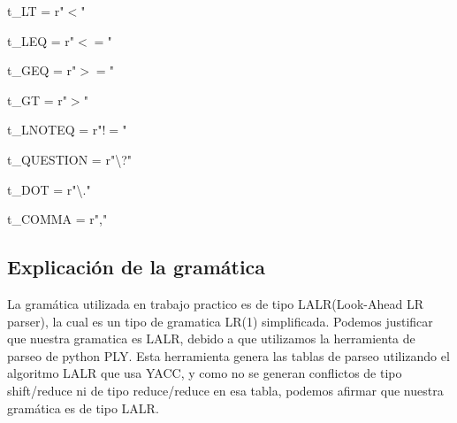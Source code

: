 t\_LT = r"$<$"
                                            
t\_LEQ = r"$<=$"
                                               
t\_GEQ = r"$>=$"
                                                 
t\_GT = r"$>$"
                                                   
t\_LNOTEQ = r"$!=$"
                                                     
t\_QUESTION = r"\textbackslash?"
                                                      
t\_DOT = r"\textbackslash."
                                                         
t\_COMMA = r","

\subsection{Explicación de la gramática}
La gramática utilizada en trabajo practico es de tipo LALR(Look-Ahead LR
parser), la cual es un tipo de gramatica LR(1) simplificada. Podemos justificar
que nuestra gramatica es LALR, debido a que utilizamos la herramienta de
parseo de python PLY. Esta herramienta genera las tablas de parseo utilizando
el algoritmo LALR que usa YACC, y como no se generan conflictos de tipo
shift/reduce ni de tipo reduce/reduce en esa tabla, podemos afirmar que nuestra
gramática es de tipo LALR.

